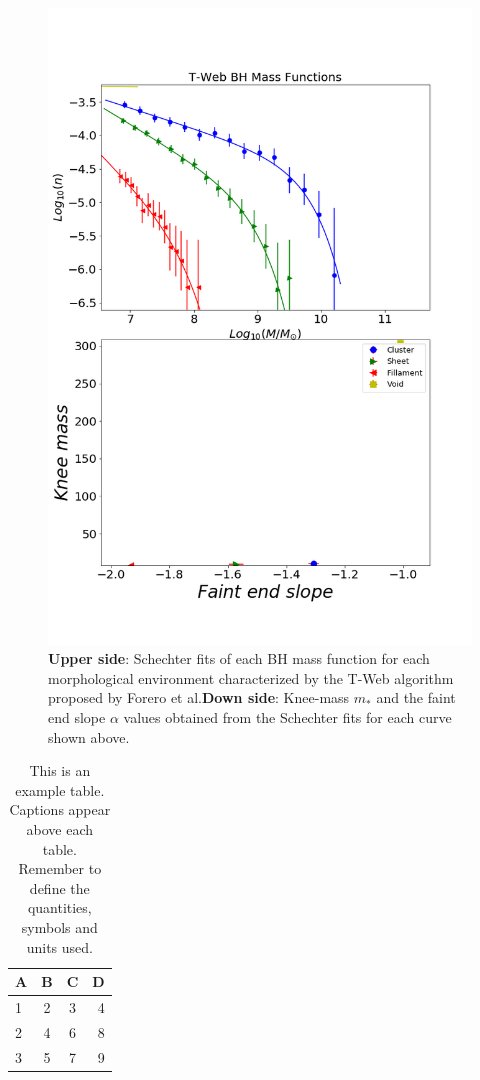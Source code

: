 \documentclass[a4paper,fleqn,usenatbib]{mnras}
\begin{document}
\begin{figure}
	\includegraphics[width=\columnwidth]{./pics/T-Web_BH.png}
    \caption{\textbf{Upper side}: Schechter fits of each BH mass function for each morphological environment characterized by the T-Web algorithm proposed by Forero et al.\textbf{Down side}: Knee-mass $m_\ast$ and the faint end slope $\alpha$ values obtained from the Schechter fits for each curve shown above.}
    \label{fig:TwebBH}
\end{figure}

\begin{table}
	\centering
	\caption{This is an example table. Captions appear above each table.
	Remember to define the quantities, symbols and units used.}
	\label{tab:example_table}
	\begin{tabular}{lccr} %
		\hline
		A & B & C & D\\
		\hline
		1 & 2 & 3 & 4\\
		2 & 4 & 6 & 8\\
		3 & 5 & 7 & 9\\
		\hline
	\end{tabular}
\end{table}
\end{document}

